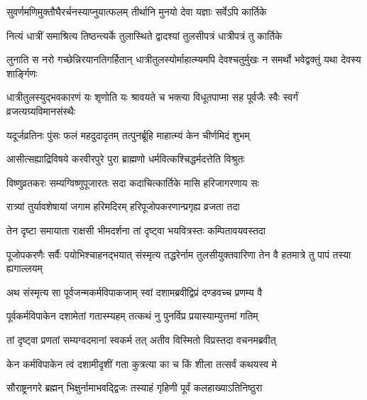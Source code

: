 \twolineshloka
{सुवर्णमणिमुक्तौघैरर्चनस्याप्नुयात्फलम्}
{तीर्थानि मुनयो देवा यज्ञाः सर्वेऽपि कार्तिके} %

\twolineshloka
{नित्यं धात्रीं समाश्रित्य तिष्ठन्त्यर्के तुलास्थिते}
{द्वादश्यां तुलसीपत्रं धात्रीपत्रं तु कार्तिके} %

\threelineshloka
{लुनाति स नरो गच्छेन्निरयानतिगर्हितान्}
{धात्रीतुलस्योर्माहात्म्यमपि देवश्चतुर्मुखः}
{न समर्थो भवेद्वक्तुं यथा देवस्य शार्ङ्गिणः} %

\fourlineindentedshloka
{धात्रीतुलस्युद्भवकारणं यः}
{शृणोति यः श्रावयते च भक्त्या}
{विधूतपाप्मा सह पूर्वजैः स्वैः}
{स्वर्गं व्रजत्यग्र्यविमानसंस्थैः} %





\twolineshloka
{यदूर्जव्रतिनः पुंसः फलं महदुदादृतम्}
{तत्पुनर्ब्रूहि माहात्म्यं केन चीर्णमिदं शुभम्} %


\twolineshloka
{आसीत्सह्याद्रिविषये करवीरपुरे पुरा}
{ब्राह्मणो धर्मवित्कश्चिद्धर्मदत्तेति विश्रुतः} %

\twolineshloka
{विष्णुव्रतकरः सम्यग्विष्णुपूजारतः सदा}
{कदाचित्कार्तिके मासि हरिजागरणाय सः} %

\twolineshloka
{रात्र्यां तुर्यावशेषायां जगाम हरिमदिरम्}
{हरिपूजोपकरणान्प्रगृह्य व्रजता तदा} %

\twolineshloka
{तेन दृष्टा समायाता राक्षसी भीमदर्शना}
{तां दृष्ट्वा भयवित्रस्तः कम्पितावयवस्तदा} %

\threelineshloka
{पूजोपकरणैः सर्वैः पयोभिश्चाहनद्भयात्}
{संस्मृत्य तद्धरेर्नाम तुलसीयुक्तवारिणा}
{तेन वै हतमात्रे तु पापं तस्या ह्यगाल्लयम्} %

\twolineshloka
{अथ संस्मृत्य सा पूर्वजन्मकर्मविपाकजाम्}
{स्वां दशामब्रवीद्विप्रं दण्डवच्च प्रणम्य वै} %


\twolineshloka
{पूर्वकर्मविपाकेन दशामेतां गतास्म्यहम्}
{तत्कथं नु पुनर्विप्र प्रयास्याम्युत्तमां गतिम्} %


\twolineshloka
{तां दृष्ट्वा प्रणतां सम्यग्वदमानां स्वकर्म तत्}
{अतीव विस्मितो विप्रस्तदा वचनमब्रवीत्} %

\twolineshloka
{केन कर्मविपाकेन त्वं दशामीदृशीं गता}
{कुत्रत्या का च किं शीला तत्सर्वं कथयस्व मे} %


\twolineshloka
{सौराष्ट्रनगरे ब्रह्मन् भिक्षुर्नामाभवद्द्विजः}
{तस्याहं गृहिणी पूर्वं कलहाख्याऽतिनिष्ठुरा} %

